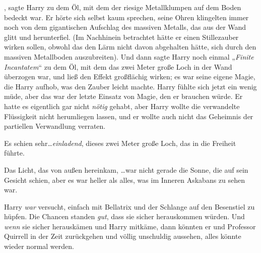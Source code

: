 , sagte Harry zu dem Öl, mit dem der riesige Metallklumpen auf dem Boden bedeckt war. Er hörte sich selbst kaum sprechen, seine Ohren klingelten immer noch von dem gigantischen Aufschlag des massiven Metalls, das aus der Wand glitt und herunterfiel. (Im Nachhinein betrachtet hätte er einen Stillezauber wirken sollen, obwohl das den Lärm nicht davon abgehalten hätte, sich durch den massiven Metallboden auszubreiten). Und dann sagte Harry noch einmal „\emph{Finite} \emph{Incantatem}“ zu dem Öl, mit dem das zwei Meter große Loch in der Wand überzogen war, und ließ den Effekt großflächig wirken; es war seine eigene Magie, die Harry aufhob, was den Zauber leicht machte. Harry fühlte sich jetzt ein wenig müde, aber das war der letzte Einsatz von Magie, den er brauchen würde. Er hatte es eigentlich gar nicht \emph{nötig} gehabt, aber Harry wollte die verwandelte Flüssigkeit nicht herumliegen lassen, und er wollte auch nicht das Geheimnis der partiellen Verwandlung verraten.

Es schien sehr…\emph{einladend}, dieses zwei Meter große Loch, das in die Freiheit führte.

Das Licht, das von außen hereinkam, …war nicht gerade die Sonne, die auf sein Gesicht schien, aber es war heller als alles, was im Inneren Askabans zu sehen war.

Harry \emph{war} versucht, einfach mit Bellatrix und der Schlange auf den Besenstiel zu hüpfen. Die Chancen standen \emph{gut}, dass sie sicher herauskommen würden. Und \emph{wenn} sie sicher herauskämen und Harry mitkäme, dann könnten er und Professor Quirrell in der Zeit zurückgehen und völlig unschuldig aussehen, alles könnte wieder normal werden.

